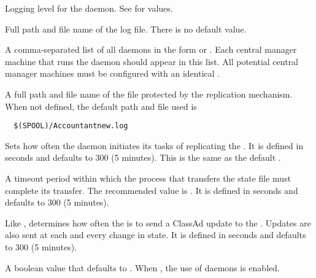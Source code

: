 \begin{description}
\label{param:HADDebug}
\item[\Macro{HAD\_DEBUG}]
  Logging level for the  daemon.
  See  for values.

\label{param:HADLog}
\item[\Macro{HAD\_LOG}]
  Full path and file name of the log file.
  There is no default value.

\label{param:ReplicationList}
\item[\Macro{REPLICATION\_LIST}]
  A comma-separated list of all  daemons
  in the form  or .
  Each central manager machine that runs the  daemon
  should appear in this list.
  All potential central manager machines must be configured with
  an identical .

\label{param:StateFile}
\item[\Macro{STATE\_FILE}]
  A full path and file name of the file protected by the replication
  mechanism.
  When not defined, the default path and file used is
  \begin{verbatim}
  $(SPOOL)/Accountantnew.log
  \end{verbatim}

\label{param:ReplicationInterval}
\item[\Macro{REPLICATION\_INTERVAL}]
  Sets how often the  daemon initiates its tasks of
  replicating the .
  It is defined in seconds and defaults to 300 (5 minutes).
  This is the same as the default .

\label{param:MaxTransferLifetime}
\item[\Macro{MAX\_TRANSFERER\_LIFETIME}]
  A timeout period within which the process that
  transfers the state file must complete its transfer.
  The recommended value is
  .
  It is defined in seconds and defaults to 300 (5 minutes).

\label{param:HADUpdateInterval}
\item[\Macro{HAD\_UPDATE\_INTERVAL}]
  Like ,
  determines how often the  is to send a ClassAd update
  to the .
  Updates are also sent at each and every change in state.
  It is defined in seconds and defaults to 300 (5 minutes).

\label{param:HADUseReplication}
\item[\Macro{HAD\_USE\_REPLICATION}]
  A boolean value that defaults to .
  When , the use of  daemons is enabled.


\end{description}
